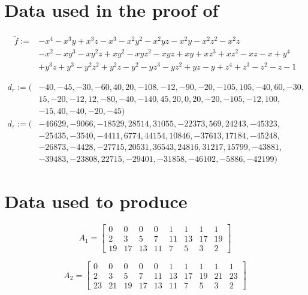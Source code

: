 \documentclass[a4paper]{article}
\theoremstyle{remark}
\begin{document}
\newpage

\appendix

\section{Data used in the proof of }
\label{sec:datadisc}

\begin{align*}
  \tilde{f} := &-x^4 - x^3y + x^3z - x^3 - x^2y^2 - x^2yz - x^2y - x^2z^2 - x^2z\\
            &- x^2 - xy^3 - xy^2z + xy^2 - xyz^2 - xyz + xy + xz^3 + xz^2 - xz - x + y^4 \\
  &+ y^3z + y^3 - y^2z^2 + y^2z - y^2 - yz^3 - yz^2 + yz - y + z^4 + z^3 - z^2 - z - 1
\end{align*}

\vspace{-0.6cm}
\begin{align*}
  d_{r} := (&-40, -45, -30, -60, 40, 20, -108, -12, -90, -20, -105, 105, -40, 60, -30,\\
            &15, -20, -12, 12, -80, -40, -140, 45, 20, 0, 20, -20, -105, -12, 100,\\
            &-15, 40, -40, -20, -45)\\
  d_{\varepsilon} := (&-46629, -9066, -18529, 28514, 31055, -22373, 569, 24243, -45323,\\
            &-25435, -3540, -4411, 6774, 44154, 10846, -37613, 17184, -45248,\\
            &-26873, -4428, -27715, 20531, 36543, 24816, 31217, 15799, -43881,\\
            &-39483, -23808, 22715, -29401, -31858, -46102, -5886, -42199)
\end{align*}

\section{Data used to produce }
\label{sec:adiscdata}

\[
  A_1 =
  \begin{bmatrix}
    0 & 0 & 0 & 0 & 1 & 1 & 1 & 1 \\
    2 & 3 & 5 & 7 & 11 & 13 & 17 & 19 \\
    19 & 17 & 13 & 11 & 7 & 5 & 3 & 2
  \end{bmatrix}
\]

\[
  A_2 =
  \begin{bmatrix}
    0 & 0 & 0 & 0 & 0 & 1 & 1 & 1 & 1 & 1 \\
    2 & 3 & 5 & 7 & 11 & 13 & 17 & 19 & 21 & 23 \\
    23 & 21 & 19 & 17 & 13 & 11 & 7 & 5 & 3 & 2
  \end{bmatrix}
\]
\end{document}
